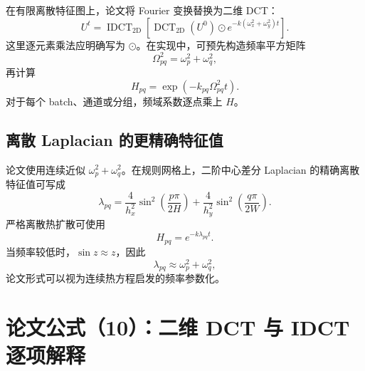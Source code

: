 \documentclass[UTF8,12pt,a4paper,fontset=none]{ctexart}
\numberwithin{equation}{section}
\newcommand{\DCT}{\operatorname{DCT}_{2\mathrm{D}}}
\newcommand{\IDCT}{\operatorname{IDCT}_{2\mathrm{D}}}
\begin{document}
在有限离散特征图上，论文将 Fourier 变换替换为二维 DCT：
\begin{equation}
  \boxed{
  U^t
  =\IDCT\left[
  \DCT(U^0)\odot
  e^{-k(\omega_x^2+\omega_y^2)t}
  \right]
  }.
  \tag{9}
  \label{eq:paper9}
\end{equation}
这里逐元素乘法应明确写为 $\odot$。在实现中，可预先构造频率平方矩阵
\begin{equation}
  \Omega^2_{pq}=\omega_p^2+\omega_q^2,
\end{equation}
再计算
\begin{equation}
  H_{pq}=\exp(-k_{pq}\Omega^2_{pq}t).
\end{equation}
对于每个 batch、通道或分组，频域系数逐点乘上 $H$。

\subsection{离散 Laplacian 的更精确特征值}

论文使用连续近似 $\omega_p^2+\omega_q^2$。在规则网格上，二阶中心差分 Laplacian 的精确离散特征值可写成
\begin{equation}
  \lambda_{pq}
  =\frac{4}{h_x^2}
  \sin^2\left(\frac{p\pi}{2H}\right)
  +\frac{4}{h_y^2}
  \sin^2\left(\frac{q\pi}{2W}\right).
  \label{eq:discrete-eigenvalue}
\end{equation}
严格离散热扩散可使用
\begin{equation}
  H_{pq}=e^{-k\lambda_{pq}t}.
\end{equation}
当频率较低时，$\sin z\approx z$，因此
\begin{equation}
  \lambda_{pq}\approx\omega_p^2+\omega_q^2,
\end{equation}
论文形式可以视为连续热方程启发的频率参数化。

\section{论文公式（10）：二维 DCT 与 IDCT 逐项解释}
\end{document}
